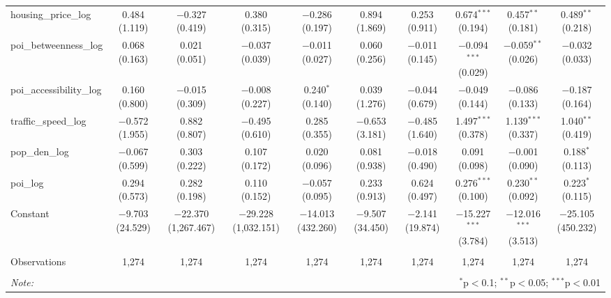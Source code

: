 \begin{table}[!htbp]
\begin{tabular}{@{\extracolsep{1pt}}lccccccccc}
  housing\_price\_log & 0.484 (1.119) & $-$0.327 (0.419) & 0.380 (0.315) & $-$0.286 (0.197) & 0.894 (1.869) & 0.253 (0.911) & 0.674$^{***}$ (0.194) & 0.457$^{**}$ (0.181) & 0.489$^{**}$ (0.218) \\ 
  poi\_betweenness\_log & 0.068 (0.163) & 0.021 (0.051) & $-$0.037 (0.039) & $-$0.011 (0.027) & 0.060 (0.256) & $-$0.011 (0.145) & $-$0.094$^{***}$ (0.029) & $-$0.059$^{**}$ (0.026) & $-$0.032 (0.033) \\ 
  poi\_accessibility\_log & 0.160 (0.800) & $-$0.015 (0.309) & $-$0.008 (0.227) & 0.240$^{*}$ (0.140) & 0.039 (1.276) & $-$0.044 (0.679) & $-$0.049 (0.144) & $-$0.086 (0.133) & $-$0.187 (0.164) \\ 
  traffic\_speed\_log & $-$0.572 (1.955) & 0.882 (0.807) & $-$0.495 (0.610) & 0.285 (0.355) & $-$0.653 (3.181) & $-$0.485 (1.640) & 1.497$^{***}$ (0.378) & 1.139$^{***}$ (0.337) & 1.040$^{**}$ (0.419) \\ 
  pop\_den\_log & $-$0.067 (0.599) & 0.303 (0.222) & 0.107 (0.172) & 0.020 (0.096) & 0.081 (0.938) & $-$0.018 (0.490) & 0.091 (0.098) & $-$0.001 (0.090) & 0.188$^{*}$ (0.113) \\ 
  poi\_log & 0.294 (0.573) & 0.282 (0.198) & 0.110 (0.152) & $-$0.057 (0.095) & 0.233 (0.913) & 0.624 (0.497) & 0.276$^{***}$ (0.100) & 0.230$^{**}$ (0.092) & 0.223$^{*}$ (0.115) \\ 
  Constant & $-$9.703 (24.529) & $-$22.370 (1,267.467) & $-$29.228 (1,032.151) & $-$14.013 (432.260) & $-$9.507 (34.450) & $-$2.141 (19.874) & $-$15.227$^{***}$ (3.784) & $-$12.016$^{***}$ (3.513) & $-$25.105 (450.232) \\ 
 \hline \\[-1.8ex] 
Observations & 1,274 & 1,274 & 1,274 & 1,274 & 1,274 & 1,274 & 1,274 & 1,274 & 1,274 \\ 
\hline 
\hline \\[-1.8ex] 
\textit{Note:}  & \multicolumn{9}{r}{$^{*}$p$<$0.1; $^{**}$p$<$0.05; $^{***}$p$<$0.01} \\ 
\end{tabular} 
\end{table} 

